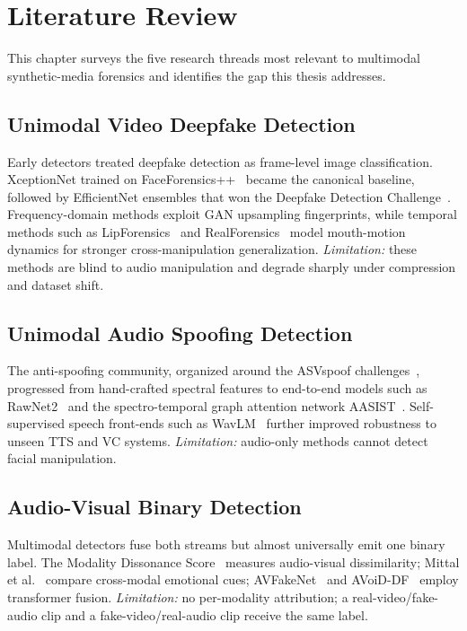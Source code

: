 \chapter{Literature Review}
\label{ch:literature}

This chapter surveys the five research threads most relevant to multimodal
synthetic-media forensics and identifies the gap this thesis addresses.

\section{Unimodal Video Deepfake Detection}
Early detectors treated deepfake detection as frame-level image classification.
XceptionNet trained on FaceForensics++~\cite{rossler2019faceforensics} became the
canonical baseline, followed by EfficientNet ensembles that won the Deepfake
Detection Challenge~\cite{dolhansky2020dfdc}. Frequency-domain methods exploit
GAN upsampling fingerprints, while temporal methods such as
LipForensics~\cite{haliassos2021lipforensics} and
RealForensics~\cite{haliassos2022realforensics} model mouth-motion dynamics for
stronger cross-manipulation generalization. \emph{Limitation:} these methods are
blind to audio manipulation and degrade sharply under compression and dataset
shift.

\section{Unimodal Audio Spoofing Detection}
The anti-spoofing community, organized around the ASVspoof
challenges~\cite{wang2020asvspoof}, progressed from hand-crafted spectral features
to end-to-end models such as RawNet2~\cite{tak2021rawnet2} and the spectro-temporal
graph attention network AASIST~\cite{jung2022aasist}. Self-supervised speech
front-ends such as WavLM~\cite{chen2022wavlm} further improved robustness to unseen
TTS and VC systems. \emph{Limitation:} audio-only methods cannot detect facial
manipulation.

\section{Audio-Visual Binary Detection}
Multimodal detectors fuse both streams but almost universally emit one binary
label. The Modality Dissonance Score~\cite{chugh2020mds} measures audio-visual
dissimilarity; Mittal et al.~\cite{mittal2020emotions} compare cross-modal
emotional cues; AVFakeNet~\cite{ilyas2023avfakenet} and
AVoiD-DF~\cite{yang2023avoiddf} employ transformer fusion. \emph{Limitation:} no
per-modality attribution; a real-video/fake-audio clip and a fake-video/real-audio
clip receive the same label.

